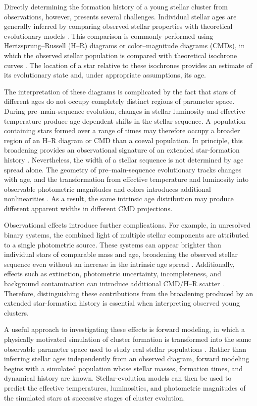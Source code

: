 \documentclass[linenumbers, twocolumn]{aastex631}
\begin{document}
Directly determining the formation history of a young stellar cluster from observations, however, presents several challenges. Individual stellar ages are generally inferred by comparing observed stellar properties with theoretical evolutionary models \citep{Soderblom2010}. This comparison is commonly performed using Hertzsprung--Russell (H--R) diagrams or color--magnitude diagrams (CMDs), in which the observed stellar population is compared with theoretical isochrone curves \citep{Hillenbrand2008}. The location of a star relative to these isochrones provides an estimate of its evolutionary state and, under appropriate assumptions, its age.

The interpretation of these diagrams is complicated by the fact that stars of different ages do not occupy completely distinct regions of parameter space. During pre--main-sequence evolution, changes in stellar luminosity and effective temperature produce age-dependent shifts in the stellar sequence. A population containing stars formed over a range of times may therefore occupy a broader region of an H--R diagram or CMD than a coeval population. In principle, this broadening provides an observational signature of an extended star-formation history \citep{Hillenbrand2008,Reggiani2011}. Nevertheless, the width of a stellar sequence is not determined by age spread alone. The geometry of pre--main-sequence evolutionary tracks changes with age, and the transformation from effective temperature and luminosity into observable photometric magnitudes and colors introduces additional nonlinearities \citep{Bell2012,PecautMamajek2013}. As a result, the same intrinsic age distribution may produce different apparent widths in different CMD projections.

Observational effects introduce further complications. For example, in unresolved binary systems, the combined light of multiple stellar components are attributed to a single photometric source. These systems can appear brighter than individual stars of comparable mass and age, broadening the observed stellar sequence even without an increase in the intrinsic age spread \citep{HurleyTout1998,DaRio2010}. Additionally, effects such as extinction, photometric uncertainty, incompleteness, and background contamination can introduce additional CMD/H--R scatter \citep{DaRio2010,Reggiani2011}. Therefore, distinguishing these contributions from the broadening produced by an extended star-formation history is essential when interpreting observed young clusters.

A useful approach to investigating these effects is forward modeling, in which a physically motivated simulation of cluster formation is transformed into the same observable parameter space used to study real stellar populations \citep{DaRio2010,Masegian2021}. Rather than inferring stellar ages independently from an observed diagram, forward modeling begins with a simulated population whose stellar masses, formation times, and dynamical history are known. Stellar-evolution models can then be used to predict the effective temperatures, luminosities, and photometric magnitudes of the simulated stars at successive stages of cluster evolution.
\end{document}
